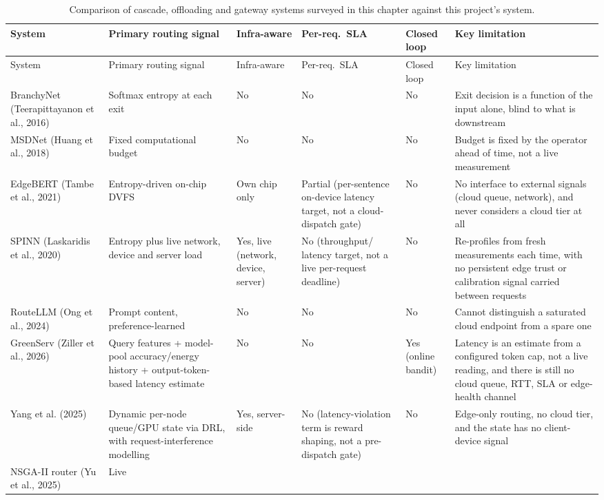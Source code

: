 {\small\setlength{\tabcolsep}{4pt}
\begin{longtable}{p{2.3cm}p{2.9cm}p{1.5cm}p{1.5cm}p{1.3cm}p{3.2cm}}
\caption{Comparison of cascade, offloading and gateway systems surveyed
in this chapter against this project's system.}\label{tab:comparison}\\
\toprule System & Primary routing signal & Infra-aware & Per-req.\ SLA &
Closed loop & Key limitation \\ \midrule \endfirsthead
\toprule System & Primary routing signal & Infra-aware & Per-req.\ SLA &
Closed loop & Key limitation \\ \midrule \endhead BranchyNet
(Teerapittayanon et al., 2016) & Softmax entropy at each exit & No & No
& No & Exit decision is a function of the input alone, blind to what is
downstream \\ MSDNet (Huang et al., 2018) & Fixed computational budget &
No & No & No & Budget is fixed by the operator ahead of time, not a
live measurement \\ EdgeBERT (Tambe et al., 2021) & Entropy-driven
on-chip DVFS & Own chip only & Partial (per-sentence on-device latency
target, not a cloud-dispatch gate) & No & No interface to external
signals (cloud queue, network), and never considers a cloud tier at all
\\ SPINN (Laskaridis et al., 2020) & Entropy plus live network, device
and server load & Yes, live (network, device, server) & No (throughput/
latency target, not a live per-request deadline) & No & Re-profiles
from fresh measurements each time, with no persistent edge trust or
calibration signal carried between requests \\ RouteLLM (Ong et
al., 2024) & Prompt content, preference-learned & No & No & No & Cannot
distinguish a saturated cloud endpoint from a spare one \\ GreenServ
(Ziller et al., 2026) & Query features + model-pool accuracy/energy
history + output-token-based latency estimate & No & No & Yes (online
bandit) & Latency is an estimate from a configured token cap, not a
live reading, and there is still no cloud queue, RTT, SLA or
edge-health channel \\ Yang et al. (2025) & Dynamic per-node queue/GPU
state via DRL, with request-interference modelling & Yes, server-side &
No (latency-violation term is reward shaping, not a pre-dispatch gate)
& No & Edge-only routing, no cloud tier, and the state has no
client-device signal \\ NSGA-II router (Yu et al., 2025) & Live

\end{longtable}}
